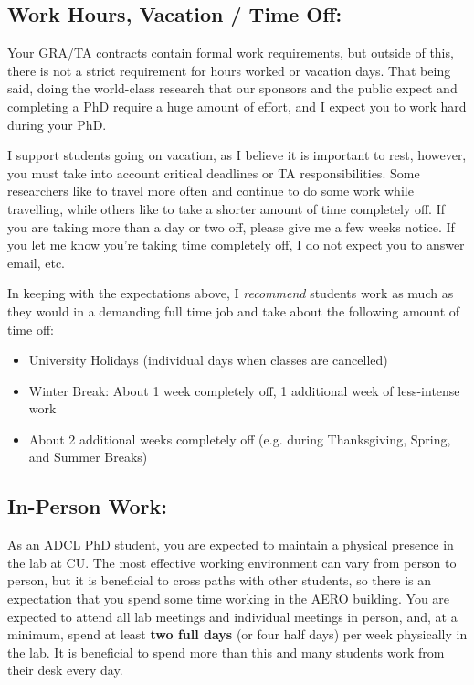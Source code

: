 \documentclass[11pt,letterpaper]{article}
\begin{document}
\subsection{Work Hours, Vacation / Time Off:} Your GRA/TA contracts contain formal work requirements, but outside of this, there is not a strict requirement for hours worked or vacation days. That being said, doing the world-class research that our sponsors and the public expect and completing a PhD require a huge amount of effort, and I expect you to work hard during your PhD.

I support students going on vacation, as I believe it is important to rest, however, you must take into account critical deadlines or TA responsibilities. Some researchers like to travel more often and continue to do some work while travelling, while others like to take a shorter amount of time completely off. If you are taking more than a day or two off, please give me a few weeks notice. If you let me know you're taking time completely off, I do not expect you to answer email, etc. 

In keeping with the expectations above, I \emph{recommend} students work as much as they would in a demanding full time job and take about the following amount of time off:
\begin{itemize}[nosep, leftmargin=*]
\item University Holidays (individual days when classes are cancelled)
\item Winter Break: About 1 week completely off, 1 additional week of less-intense work
\item About 2 additional weeks completely off (e.g. during Thanksgiving, Spring, and Summer Breaks)
\end{itemize}

\subsection{In-Person Work:} As an ADCL PhD student, you are expected to maintain a physical presence in the lab at CU. The most effective working environment can vary from person to person, but it is beneficial to cross paths with other students, so there is an expectation that you spend some time working in the AERO building. You are expected to attend all lab meetings and individual meetings in person, and, at a minimum, spend at least \textbf{two full days} (or four half days) per week physically in the lab. It is beneficial to spend more than this and many students work from their desk every day.
\end{document}
